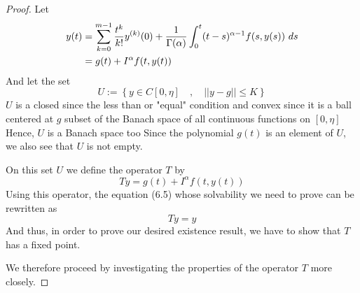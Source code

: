 \begin{proof}[Proof]
    Let 
    \begin{align}
        \notag y(t) &= \sum_{k=0}^{m-1} \frac{t^k}{k!} y^{(k)}(0) + \frac{1}{\Gamma(\alpha)}\int_{0}^{t} (t-s)^{\alpha-1}f(s,y(s)) \,\, ds
        \\
        &= g(t) + I^\alpha f(t,y(t))
    \end{align}
    And let the set 
    \[
        U := \left\{ y \in C[0, \eta] \quad,\quad ||y-g|| \leq K \right\}
    \]
    $U$ is a closed since the less than or "equal" condition and convex since it is a ball centered at $g$ subset of the Banach space of all continuous functions on $[0, \eta]$ Hence, $U$ is a Banach space too
    Since the polynomial $g(t)$ is an element of $U$, we also see that $U$ is not empty. 
    
    On this set $U$ we define the operator $T$ by
    \[
        Ty = g(t) + I^\alpha f(t,y(t))
    \]
    Using this operator, the equation (6.5) whose solvability we need to prove can be rewritten as
    \[
        Ty = y
    \]
    And thus, in order to prove our desired existence result, we have to show that $T$ has
    a fixed point. 
    
    We therefore proceed by investigating the properties of the operator $T$ more closely.
    

\end{proof}

